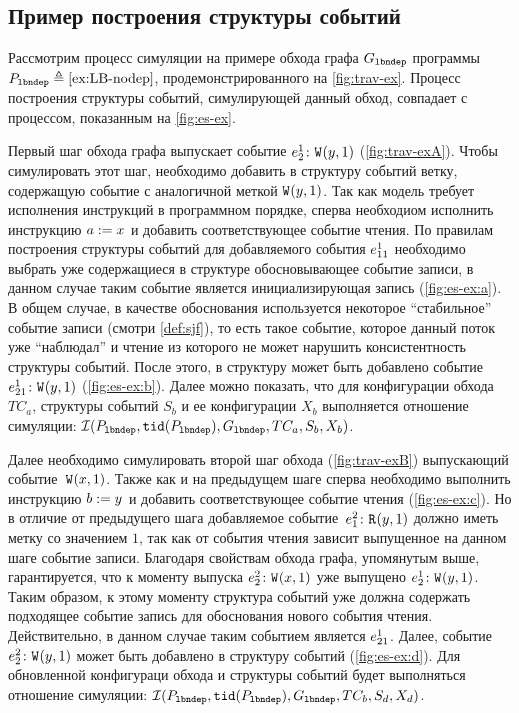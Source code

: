 
\subsection{Пример построения структуры событий}

Рассмотрим процесс симуляции на примере
обхода графа $G_{\mathtt{lbndep}}$ программы $P_{\mathtt{lbndep}} \triangleq \text{\ref{ex:LB-nodep}}$,
продемонстрированного на \cref{fig:trav-ex}.
Процесс построения структуры событий,
симулирующей данный обход, совпадает с процессом,
показанным на \cref{fig:es-ex}.



Первый шаг обхода графа выпускает событие
$e^{1}_{2}\colon {{\mathtt{W}}}^{}({y},{1}){}$ (\cref{fig:trav-exA}).
Чтобы симулировать этот шаг, необходимо добавить
в структуру событий ветку, содержащую событие
с аналогичной меткой ${{\mathtt{W}}}^{}({y},{1}){}$.
Так как модель \Wkm требует исполнения инструкций
в программном порядке, сперва необходиом исполнить  
инструкцию $a \;{:=}\;{x}^{}$ и добавить соответствующее событие чтения.
По правилам построения структуры событий \Wkm
для добавляемого события $e^{1}_{11}$ необходимо
выбрать уже содержащиеся в структуре обосновывающее событие записи,
в данном случае таким событие является
инициализирующая запись (\cref{fig:es-ex:a}).
В общем случае, в качестве обоснования используется
некоторое ``стабильное'' событие записи (смотри \cref{def:sjf}),
то есть такое событие, которое данный поток уже ``наблюдал''
и чтение из которого не может нарушить консистентность структуры событий.
После этого, в структуру может быть добавлено событие
$e^{1}_{21}\colon {{\mathtt{W}}}^{}({y},{1})$ (\cref{fig:es-ex:b}).
Далее можно показать, что для конфигурации обхода $TC_a$,
структуры событий $S_b$ и ее конфигурации $X_b$
выполняется отношение симуляции:
$\mathcal{I}(P_{\mathtt{lbndep}}, {\mathtt{tid}}(P_{\mathtt{lbndep}}), G_{\mathtt{lbndep}}, TC_a, S_b, X_b)$.


Далее необходимо симулировать второй шаг обхода
(\cref{fig:trav-exB}) выпускающий событие~${{\mathtt{W}}}^{}({x},{1})$.
Также как и на предыдущем шаге сперва необходимо
выполнить инструкцию $b \;{:=}\;{y}^{}$ и добавить соответствующее
событие чтения (\cref{fig:es-ex:c}). Но в отличие от предыдущего шага
добавляемое событие~$e^{2}_{1}\colon {{\mathtt{R}}}^{}({y},{1})$ должно иметь
метку со значением $1$, так как от события чтения
зависит выпущенное на данном шаге событие записи.
Благодаря свойствам обхода графа, упомянутым выше,
гарантируется, что к моменту выпуска $e^{2}_{2}\colon {{\mathtt{W}}}^{}({x},{1}){}$
уже выпущено $e^{1}_{2}\colon {{\mathtt{W}}}^{}({y},{1})$.
Таким образом, к этому моменту структура событий уже должна
содержать подходящее событие запись для обоснования нового события чтения.
Действительно, в данном случае таким событием является $e^{1}_{21}$.
Далее, событие $e^{2}_{2}\colon {{\mathtt{W}}}^{}({y},{1}){}$ может быть добавлено
в структуру событий (\cref{fig:es-ex:d}).
Для обновленной конфигураци обхода и структуры событий
будет выполняться отношение симуляции:
$\mathcal{I}(P_{\mathtt{lbndep}}, {\mathtt{tid}}(P_{\mathtt{lbndep}}), G_{\mathtt{lbndep}}, TC_b, S_d, X_d)$.


